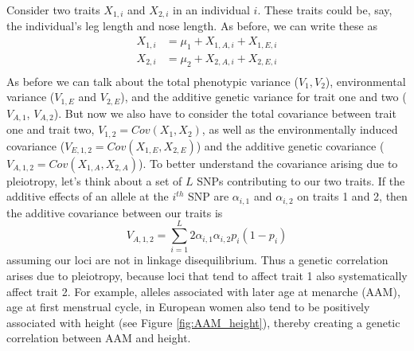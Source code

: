 Consider two traits $X_{1,i}$ and $X_{2,i}$ in an individual $i$. These traits could be,
say, the individual's leg length and nose length. As before, we can write
these as 
\begin{eqnarray}
X_{1,i} &= \mu_1+ X_{1,A,i} + X_{1,E,i}  \nonumber \\
X_{2,i} &= \mu_2 +X_{2,A,i} + X_{2,E,i} \nonumber \\
\end{eqnarray}
As before we can talk about the total phenotypic variance ($V_1,V_2$),
environmental variance  ($V_{1,E}$ and $V_{2,E}$), and the additive genetic variance for trait one and two ($V_{A,1}$, $V_{A,2}$). But now we also have to consider the 
total covariance between trait one and trait two, $V_{1,2}=Cov(X_{1},X_{2})$, as well as the environmentally induced covariance ($V_{E,1,2}=Cov(X_{1,E}
,X_{2,E} )$) and the additive genetic covariance ($V_{A,1,2}
=Cov(X_{1,A} ,X_{2,A} )$). To better understand the covariance arising due to pleiotropy, let's think about a set of $L$ SNPs contributing to our two traits. If the additive effects of an allele at the $i^{th}$ SNP are $\alpha_{i,1}$ and $\alpha_{i,2}$ on traits 1 and 2, then the additive covariance between our traits is
\begin{equation}
V_{A,1,2} = \sum_{i=1}^L 2\alpha_{i,1}\alpha_{i,2} p_i(1-p_i)
\end{equation}
assuming our loci are not in linkage disequilibrium. Thus a genetic
correlation arises due to pleiotropy, because loci that tend to affect
trait 1 also systematically affect trait 2. For example, alleles
associated with later age at menarche (AAM), age at first menstrual cycle, in European women also
tend to be positively associated with height (see Figure
\ref{fig:AAM_height}), thereby creating a genetic correlation between
AAM and height. 

